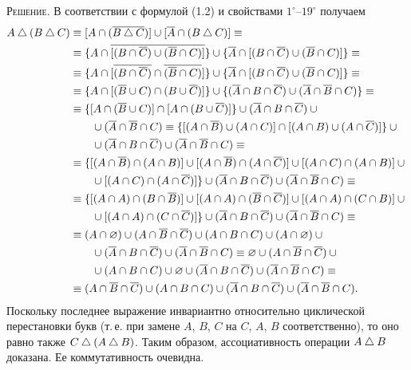 \textsc{Решение.} В соответствии с формулой (1.2) и свойствами
$1^\circ$--$19^\circ$ получаем
\begin{align*}
A\mathbin{\triangle}(B\mathbin{\triangle} C)&\equiv[A\cap(\overline{B\mathbin{\triangle} C})]\cup[\overline{A}\cap(B\mathbin{\triangle} C)]\equiv\\
&\equiv\{A\cap\overline{[(B\cap\overline{C})\cup(\overline{B}\cap C)]}\}\cup\{\overline{A}\cap[(B\cap\overline{C})\cup(\overline{B}\cap C)]\}\equiv\\
&\equiv\{A\cap[\overline{(B\cap\overline{C})}\cap\overline{(\overline{B}\cap C)}]\}\cup\{\overline{A}\cap[(B\cap\overline{C})\cup(\overline{B}\cap C)]\}\equiv\\
&\equiv\{A\cap[(\overline{B}\cup C)\cap(B\cup\overline{C})]\}\cup\{(\overline{A}\cap B\cap\overline{C})\cup(\overline{A}\cap\overline{B}\cap C)\}\equiv\\
&\equiv\{[A\cap(\overline{B}\cup C)]\cap[A\cap(B\cup\overline{C})]\}\cup(\overline{A}\cap B\cap\overline{C})\cup{}\\
&\qquad\cup(\overline{A}\cap\overline{B}\cap C)\equiv\{[(A\cap\overline{B})\cup(A\cap C)]\cap[(A\cap B)\cup(A\cap\overline{C})]\}\cup{}\\
&\qquad\cup(\overline{A}\cap B\cap\overline{C})\cup(\overline{A}\cap\overline{B}\cap C)\equiv\\
&\equiv\{[(A\cap\overline{B})\cap(A\cap B)]\cup[(A\cap\overline{B})\cap(A\cap\overline{C})]\cup[(A\cap C)\cap(A\cap B)]\cup{}\\
&\qquad\cup[(A\cap C)\cap(A\cap\overline{C})]\}\cup(\overline{A}\cap B\cap\overline{C})\cup(\overline{A}\cap\overline{B}\cap C)\equiv\\
&\equiv\{[(A\cap A)\cap(B\cap\overline{B})]\cup[(A\cap A)\cap(\overline{B}\cap\overline{C})]\cup[(A\cap A)\cap(C\cap B)]\cup{}\\
&\qquad\cup[(A\cap A)\cap(C\cap\overline{C})]\}\cup(\overline{A}\cap B\cap\overline{C})\cup(\overline{A}\cap\overline{B}\cap C)\equiv\\
&\equiv(A\cap\varnothing)\cup(A\cap\overline{B}\cap\overline{C})\cup(A\cap B\cap C)\cup(A\cap\varnothing)\cup{}\\
&\qquad\cup(\overline{A}\cap B\cap\overline{C})\cup(\overline{A}\cap\overline{B}\cap C)\equiv\varnothing\cup(A\cap\overline{B}\cap\overline{C})\cup{}\\
&\qquad\cup(A\cap B\cap C)\cup\varnothing\cup(\overline{A}\cap B\cap\overline{C})\cup(\overline{A}\cap\overline{B}\cap C)\equiv\\
&\equiv(A\cap\overline{B}\cap\overline{C})\cup(A\cap B\cap C)\cup(\overline{A}\cap B\cap\overline{C})\cup(\overline{A}\cap\overline{B}\cap C).
\end{align*}
Поскольку последнее выражение инвариантно относительно циклической
перестановки букв (т.\,е. при замене $A$, $B$, $C$ на $C$, $A$, $B$
соответственно), то оно равно также $C\mathbin{\triangle}(A\mathbin{\triangle} B)$. Таким образом,
ассоциативность операции $A\mathbin{\triangle} B$ доказана. Ее коммутативность
очевидна.\fixed{в оригинале в восьмой строке выкладки стоит скобка
<<$([A\cap A)$>> вместо <<$[(A\cap A)$>>.}

